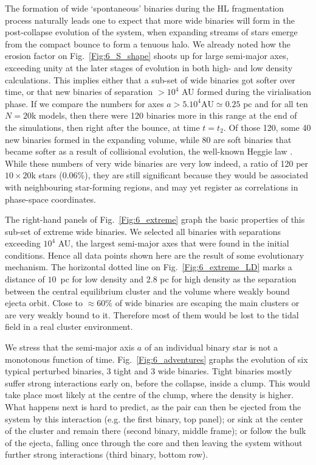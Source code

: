 The formation of wide `spontaneous' binaries during the HL fragmentation process naturally leads one to expect that more wide binaries will form in the post-collapse evolution of the system, when expanding streams of stars emerge from the compact bounce to form a tenuous halo. We already noted how the erosion factor on Fig.~\ref{Fig:6_S_shape} shoots up for large semi-major axes, exceeding unity at the later stages of evolution in both high- and low density calculations. This implies either that a sub-set of wide binaries got softer over time, or that new binaries of separation $> 10^4$ AU formed during the virialisation phase. If we compare the numbers for axes $a > 5.10^4 \textrm{AU} \simeq 0.25$ pc and for all ten $N = 20$k models, then there were 120 binaries more  in this range at the end of the simulations, then right after the bounce, at time $t = t_2$.  Of those 120, some 40 new binaries formed in the expanding volume, while 80 are  soft binaries that became softer as a result of collisional evolution, the well-known Heggie law \citep{Heggie1975,Hills1975}. While these numbers of very wide binaries  are very low indeed, a ratio of 120 per $10 \times 20$k  stars (0.06\%), they are still significant because they would be associated with neighbouring star-forming regions, and  may yet register as correlations in phase-space coordinates. 
  

The right-hand panels of Fig.~\ref{Fig:6_extreme} graph the basic properties of this sub-set of extreme wide binaries. We selected all  binaries with separations exceeding $10^4$ AU, the largest semi-major axes that were found in the initial conditions. Hence all data points shown here are the result of some evolutionary mechanism. The horizontal dotted line on Fig.~\ref{Fig:6_extreme_LD} marks a distance of $10$~pc for low density and 2.8 pc for high density as the separation between the central  equilibrium cluster and the volume where weakly bound ejecta orbit. Close to $\approx 60\% $ of wide binaries are escaping the main clusters or are very weakly bound to it. Therefore most of them would be lost to the tidal field in a real cluster environment.  
 

We stress that the semi-major axis $a$ of an individual binary star is not a monotonous function of time. Fig.~\ref{Fig:6_adventures} graphs the evolution of six typical perturbed binaries, 3 tight and 3 wide binaries. Tight binaries mostly suffer strong interactions early on, before the collapse, inside a clump. This would take place  most likely at the centre of the clump, where the density is higher. What happens next is hard to predict, as the pair can then be ejected from the system by this interaction (e.g. the first binary, top panel); or  sink at the center of the cluster and remain there (second binary, middle frame); or follow the bulk of the ejecta,  falling once through the core and then leaving the system without further strong interactions  (third binary, bottom row). 

